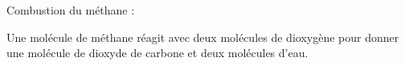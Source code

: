 \documentclass[12pt,a4paper]{article}
\begin{document}
\begin{myex}
	Combustion du méthane :
	
	
	\begin{center}
	\end{center}

Une molécule de méthane réagit avec deux molécules de dioxygène pour donner une molécule de dioxyde de carbone et deux molécules d'eau.
\end{myex}

\end{document}
